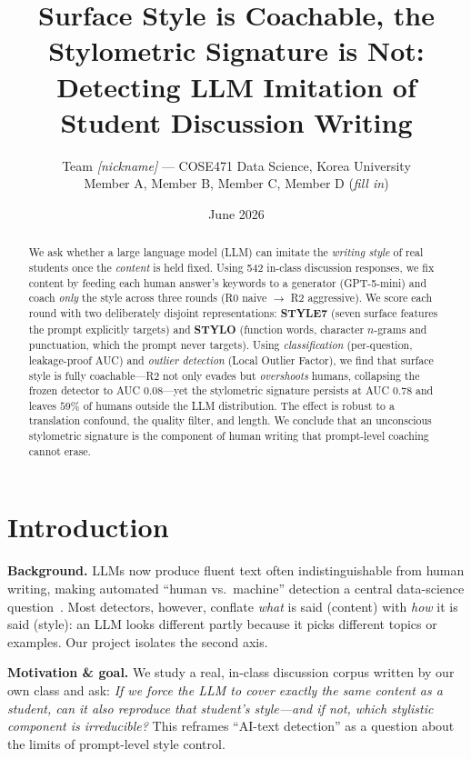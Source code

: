 \documentclass[10pt,twocolumn]{article}
\title{\vspace{-1.5em}\textbf{Surface Style is Coachable, the Stylometric Signature is Not:\\
Detecting LLM Imitation of Student Discussion Writing}}
\author{Team \emph{[nickname]} --- COSE471 Data Science, Korea University\\
\small Member A, Member B, Member C, Member D \quad(\emph{fill in})}
\date{June 2026}
\begin{document}
\maketitle

\begin{abstract}
\noindent
We ask whether a large language model (LLM) can imitate the \emph{writing style} of
real students once the \emph{content} is held fixed. Using 542 in-class discussion
responses, we fix content by feeding each human answer's keywords to a generator
(GPT-5-mini) and coach \emph{only} the style across three rounds (R0 naive
$\rightarrow$ R2 aggressive). We score each round with two deliberately disjoint
representations: \textbf{STYLE7} (seven surface features the prompt explicitly targets)
and \textbf{STYLO} (function words, character $n$-grams and punctuation, which the prompt
never targets). Using \emph{classification} (per-question, leakage-proof AUC) and
\emph{outlier detection} (Local Outlier Factor), we find that surface style is fully
coachable---R2 not only evades but \emph{overshoots} humans, collapsing the frozen
detector to AUC $0.08$---yet the stylometric signature persists at AUC $0.78$ and leaves
$59\%$ of humans outside the LLM distribution. The effect is robust to a translation
confound, the quality filter, and length. We conclude that an unconscious stylometric
signature is the component of human writing that prompt-level coaching cannot erase.
\end{abstract}

\section{Introduction}
\textbf{Background.} LLMs now produce fluent text often indistinguishable from human
writing, making automated ``human vs.\ machine'' detection a central data-science
question~\cite{mitchell2023}. Most detectors,
however, conflate \emph{what} is said (content) with \emph{how} it is said (style): an
LLM looks different partly because it picks different topics or examples. Our project
isolates the second axis.

\textbf{Motivation \& goal.} We study a real, in-class discussion corpus written by our own
class and ask: \emph{If we force the LLM to cover exactly the same content as a student,
can it also reproduce that student's style---and if not, which stylistic component is
irreducible?} This reframes ``AI-text detection'' as a question about the limits of
prompt-level style control.
\end{document}

